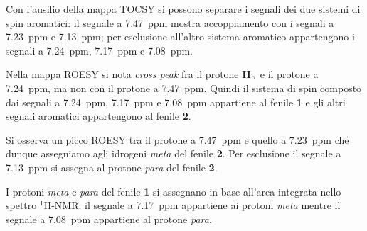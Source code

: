 \documentclass[a4paper, italian, oneside, 12pt]{article}
\begin{document}
Con l'ausilio della mappa TOCSY si possono separare i segnali dei due sistemi di spin aromatici: il segnale a 7.47~ppm mostra accoppiamento con i segnali a 7.23~ppm e 7.13~ppm; per esclusione all'altro sistema aromatico appartengono i segnali a 7.24~ppm, 7.17~ppm e 7.08~ppm.

Nella mappa ROESY si nota {\emph{cross peak}} fra il protone {\bf{H$_{\textrm b}$}} e il protone a 7.24~ppm, ma non con il protone a 7.47~ppm. Quindi il sistema di spin composto dai segnali a 7.24~ppm, 7.17~ppm e 7.08~ppm appartiene al fenile {\bf{1}} e gli altri segnali aromatici appartengono al fenile {\bf{2}}.

Si osserva un picco ROESY tra il protone a 7.47~ppm e quello a 7.23~ppm che dunque assegniamo agli idrogeni \emph{meta} del fenile {\bf{2}}. Per esclusione il segnale a 7.13~ppm si assegna al protone \emph{para} del fenile {\bf{2}}. 

I protoni \emph{meta} e \emph{para} del fenile {\bf{1}} si assegnano in base all'area integrata nello spettro $^1$H-NMR: il segnale a 7.17~ppm appartiene ai protoni \emph{meta} mentre il segnale a 7.08~ppm appartiene al protone \emph{para}.
\vspace{30pt}
\end{document}
